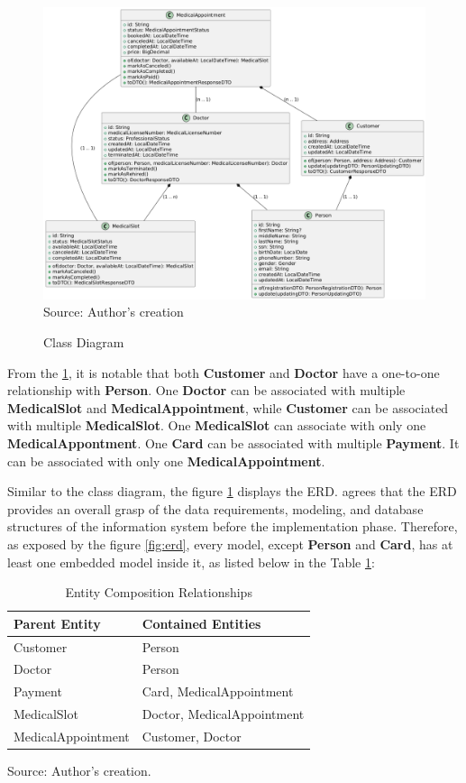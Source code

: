 \begin{figure}[H]
    \caption{Class Diagram}
    \centering
    \includegraphics[width=1\linewidth]{figures/api/class_diagram.png}
    \label{fig:class_diagram}
    \footnotesize Source: Author's creation
\end{figure}

From the \ref{fig:class_diagram}, it is notable that both \textbf{Customer} and \textbf{Doctor} have a one-to-one relationship with \textbf{Person}. One \textbf{Doctor} can be associated with multiple  \textbf{MedicalSlot} and 
\textbf{MedicalAppointment}, while \textbf{Customer} can be associated with multiple \textbf{MedicalSlot}. One \textbf{MedicalSlot} can associate with only one \textbf{MedicalAppontment}. One \textbf{Card} can be associated with multiple  \textbf{Payment}. It can be associated with only one \textbf{MedicalAppointment}.

Similar to the class diagram, the figure \ref{fig:class_diagram} displays the ERD. \cite{CAGILTAY20132184} agrees that the ERD provides an overall grasp of the data requirements, modeling, and database structures of the information system before the implementation phase. Therefore, as exposed by the figure \ref{fig:erd}, every model, except \textbf{Person} and
 \textbf{Card}, has at least one embedded model inside it, as listed below in the Table \ref{entity_relationships}:

\begin{table}[H]
\centering
\caption{Entity Composition Relationships}
\label{entity_relationships}
\begin{tabular}{p{}p{}}
\toprule
\textbf{Parent Entity} & \textbf{Contained Entities} \\
\midrule
Customer & Person \\ \hline
Doctor & Person \\ \hline
Payment & Card, MedicalAppointment \\ \hline
MedicalSlot & Doctor, MedicalAppointment \\ \hline
MedicalAppointment & Customer, Doctor \\
\bottomrule
\end{tabular}
\footnotesize Source: Author's creation.
\end{table}

